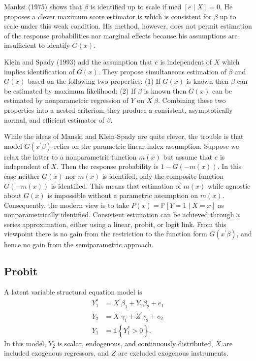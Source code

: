 \documentclass[10pt]{article}
\begin{document}
Manksi (1975) shows that $\beta$ is identified up to scale if med $[e \mid X]=0$. He proposes a clever maximum score estimator is which is consistent for $\beta$ up to scale under this weak condition. His method, however, does not permit estimation of the response probabilities nor marginal effects because his assumptions are insufficient to identify $G(x)$.

Klein and Spady (1993) add the assumption that $e$ is independent of $X$ which implies identification of $G(x)$. They propose simultaneous estimation of $\beta$ and $G(x)$ based on the following two properties: (1) If $G(x)$ is known then $\beta$ can be estimated by maximum likelihood; (2) If $\beta$ is known then $G(x)$ can be estimated by nonparametric regression of $Y$ on $X^{\prime} \beta$. Combining these two properties into a nested criterion, they produce a consistent, asymptotically normal, and efficient estimator of $\beta$.

While the ideas of Manski and Klein-Spady are quite clever, the trouble is that model $G\left(x^{\prime} \beta\right)$ relies on the parametric linear index assumption. Suppose we relax the latter to a nonparametric function $m(x)$ but assume that $e$ is independent of $X$. Then the response probability is $1-G(-m(x))$. In this case neither $G(x)$ nor $m(x)$ is identifed; only the composite function $G(-m(x))$ is identified. This means that estimation of $m(x)$ while agnostic about $G(x)$ is impossible without a parametric assumption on $m(x)$. Consequently, the modern view is to take $P(x)=\mathbb{P}[Y=1 \mid X=x]$ as nonparametrically identified. Consistent estimation can be achieved through a series approximation, either using a linear, probit, or logit link. From this viewpoint there is no gain from the restriction to the function form $G\left(x^{\prime} \beta\right)$, and hence no gain from the semiparametric approach.

\subsection{Probit}
A latent variable structural equation model is
$$
\begin{aligned}
Y_{1}^{*} &=X^{\prime} \beta_{1}+Y_{2} \beta_{2}+e_{1} \\
Y_{2} &=X^{\prime} \gamma_{1}+Z^{\prime} \gamma_{2}+e_{2} \\
Y_{1} &=\mathbb{1}\left\{Y_{1}^{*}>0\right\} .
\end{aligned}
$$
In this model, $Y_{2}$ is scalar, endogenous, and continuously distributed, $X$ are included exogenous regressors, and $Z$ are excluded exogenous instruments.
\end{document}
